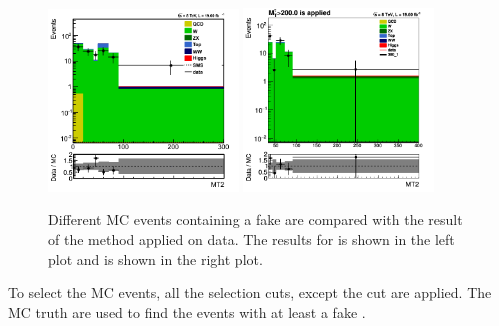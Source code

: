 \begin{figure}[!Hhtb]
\centering
\includegraphics[width=0.45\textwidth,keepaspectratio=true]{FakeRateMuTau/Estimation_ExtraLepExcl_SameSignWeightedHiggs_tauMTApplied.png}
\includegraphics[width=0.45\textwidth,keepaspectratio=true]{FakeRateEleTau/estimation_eletau_taumt200.png}
\caption{Different MC events containing a fake \Tau are compared with the result of the method applied on data. The results for \muTau is shown in the left plot and \eTau is shown in the right plot.}
\label{fig:LepTauEstimationData}
\end{figure}
To select the MC events, all the selection cuts, except the \mttwo cut are applied. 
The MC truth are used to find the events with at least a fake \Tau. 
